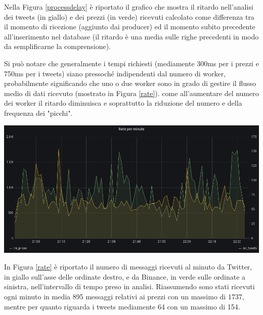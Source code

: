 Nella Figura \ref{processdelay} è riportato il grafico che mostra il ritardo nell'analisi dei tweets
(in giallo) e dei prezzi (in verde) ricevuti calcolato come differenza tra il momento di ricezione
(aggiunto dai producer) ed il momento subito precedente all'inserimento nel database (il ritardo è
una media sulle righe precedenti in modo da semplificarne la comprensione).

Si può notare che generalmente i tempi richiesti (mediamente 300ms per i prezzi e 750ms per
i tweets) siano pressoché indipendenti dal numero di worker,
probabilmente significando che uno o due worker sono in grado di gestire il flusso medio di dati
ricevuto (mostrato in Figura \ref{rate}).
come all'aumentare del numero dei worker il ritardo diminuisca e soprattutto la
riduzione del numero e della frequenza dei "picchi".

\begin{center}
    \includegraphics[max width=\linewidth]{rate.png}
    \label{rate}
\end{center}

In Figura \ref{rate} è riportato il numero di messaggi ricevuti al minuto da Twitter, in giallo
sull'asse delle ordinate destro, e da Binance, in verde sulle ordinate a sinistra, nell'intervallo
di tempo preso in analisi.
Riassumendo sono stati ricevuti ogni minuto in media 895 messaggi relativi ai prezzi con un
massimo di 1737, mentre per quanto riguarda i tweets mediamente 64 con un massimo di 154. 

